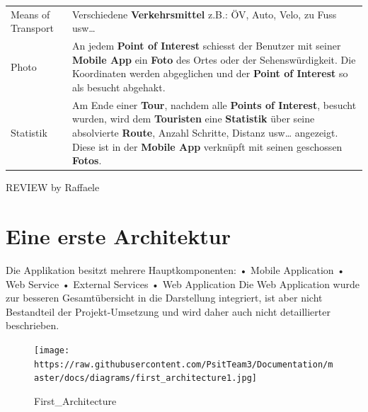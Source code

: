 \documentclass[ngerman,]{article}
\begin{document}
\begin{longtable}[]{@{}ll@{}}
\begin{minipage}[t]{0.08\columnwidth}\raggedright\strut
Means of Transport\strut
\end{minipage} & \begin{minipage}[t]{0.86\columnwidth}\raggedright\strut
Verschiedene \textbf{Verkehrsmittel} z.B.: ÖV, Auto, Velo, zu Fuss
usw\ldots{}\strut
\end{minipage}\tabularnewline
\begin{minipage}[t]{0.08\columnwidth}\raggedright\strut
Photo\strut
\end{minipage} & \begin{minipage}[t]{0.86\columnwidth}\raggedright\strut
An jedem \textbf{Point of Interest} schiesst der Benutzer mit seiner
\textbf{Mobile App} ein \textbf{Foto} des Ortes oder der
Sehenswürdigkeit. Die Koordinaten werden abgeglichen und der
\textbf{Point of Interest} so als besucht abgehakt.\strut
\end{minipage}\tabularnewline
\begin{minipage}[t]{0.08\columnwidth}\raggedright\strut
Statistik\strut
\end{minipage} & \begin{minipage}[t]{0.86\columnwidth}\raggedright\strut
Am Ende einer \textbf{Tour}, nachdem alle \textbf{Points of Interest},
besucht wurden, wird dem \textbf{Touristen} eine \textbf{Statistik} über
seine absolvierte \textbf{Route}, Anzahl Schritte, Distanz usw\ldots{}
angezeigt. Diese ist in der \textbf{Mobile App} verknüpft mit seinen
geschossen \textbf{Fotos}.\strut
\end{minipage}\tabularnewline
\bottomrule
\end{longtable}

\newpage

REVIEW by Raffaele

\section{Eine erste Architektur}\label{eine-erste-architektur}

Die Applikation besitzt mehrere Hauptkomponenten: • Mobile Application •
Web Service • External Services • Web Application Die Web Application
wurde zur besseren Gesamtübersicht in die Darstellung integriert, ist
aber nicht Bestandteil der Projekt-Umsetzung und wird daher auch nicht
detaillierter beschrieben.

\begin{figure}
\centering
\texttt{[image: https://raw.githubusercontent.com/PsitTeam3/Documentation/master/docs/diagrams/first\_architecture1.jpg]}
\caption{First\_Architecture}
\end{figure}
\end{document}
